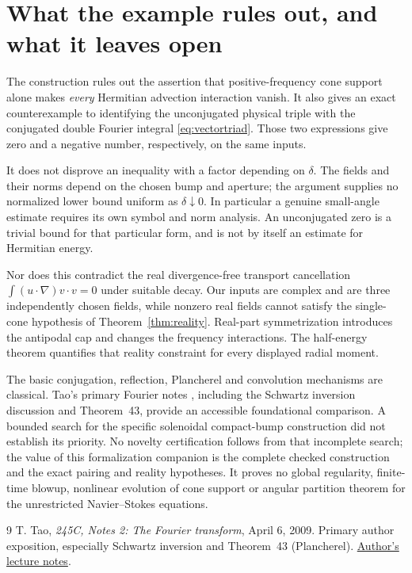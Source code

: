 \documentclass[11pt]{article}
\begin{document}
\section{What the example rules out, and what it leaves open}
The construction rules out the assertion that positive-frequency cone
support alone makes \emph{every} Hermitian advection interaction vanish.
It also gives an exact counterexample to identifying the unconjugated
physical triple with the conjugated double Fourier integral
\eqref{eq:vectortriad}. Those two expressions give zero and a negative
number, respectively, on the same inputs.

It does not disprove an inequality with a factor depending on $\delta$.
The fields and their norms depend on the chosen bump and aperture; the
argument supplies no normalized lower bound uniform as $\delta\downarrow0$.
In particular a genuine small-angle estimate requires its own symbol and
norm analysis. An unconjugated zero is a trivial bound for that particular
form, and is not by itself an estimate for Hermitian energy.

Nor does this contradict the real divergence-free transport cancellation
$\int(u\cdot\nabla)v\cdot v=0$ under suitable decay. Our inputs are
complex and are three independently chosen fields, while nonzero real
fields cannot satisfy the single-cone hypothesis of Theorem~\ref{thm:reality}.
Real-part symmetrization introduces the antipodal cap and changes the
frequency interactions. The half-energy theorem quantifies that reality
constraint for every displayed radial moment.

The basic conjugation, reflection, Plancherel and convolution mechanisms
are classical. Tao's primary Fourier notes \cite{tao}, including the
Schwartz inversion discussion and Theorem~43, provide an accessible
foundational comparison. A bounded search for the specific solenoidal
compact-bump construction did not establish its priority. No novelty
certification follows from that incomplete search; the value of this
formalization companion is the complete checked construction and the exact
pairing and reality hypotheses. It proves no global regularity, finite-time
blowup, nonlinear evolution of cone support or angular partition theorem
for the unrestricted Navier--Stokes equations.

\begin{thebibliography}{9}
 T. Tao, \emph{245C, Notes 2: The Fourier transform},
April 6, 2009. Primary author exposition, especially Schwartz inversion
and Theorem~43 (Plancherel).
\href{https://terrytao.wordpress.com/2009/04/06/the-fourier-transform/}{Author's lecture notes}.
\end{thebibliography}
\end{document}
